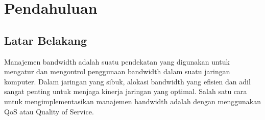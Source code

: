 \section{Pendahuluan}
\subsection{Latar Belakang}
Manajemen bandwidth adalah suatu pendekatan yang digunakan untuk mengatur dan
mengontrol penggunaan bandwidth dalam suatu jaringan komputer. Dalam jaringan yang
sibuk, alokasi bandwidth yang efisien dan adil sangat penting untuk menjaga kinerja jaringan
yang optimal. Salah satu cara untuk mengimplementasikan manajemen bandwidth adalah
dengan menggunakan QoS atau Quality of Service.
